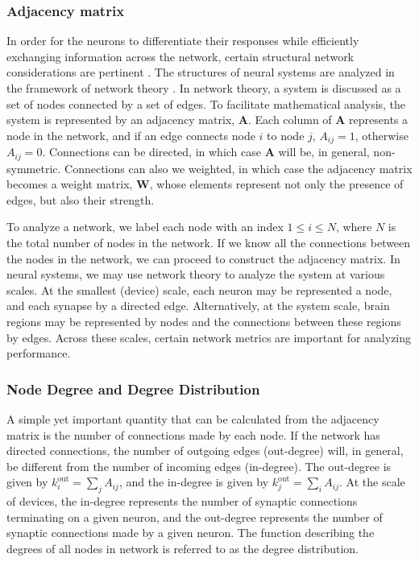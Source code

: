 \documentclass[twocolumn]{article}
\begin{document}
\subsubsection{Adjacency matrix}
In order for the neurons to differentiate their responses while efficiently exchanging information across the network, certain structural network considerations are pertinent \cite{rusp2010}. The structures of neural systems are analyzed in the framework of network theory \cite{eskn2015}. In network theory, a system is discussed as a set of nodes connected by a set of edges. To facilitate mathematical analysis, the system is represented by an adjacency matrix, $\mathbf{A}$. Each column of $\mathbf{A}$ represents a node in the network, and if an edge connects node $i$ to node $j$, $A_{ij} = 1$, otherwise $A_{ij} = 0$. Connections can be directed, in which case $\mathbf{A}$ will be, in general, non-symmetric. Connections can also we weighted, in which case the adjacency matrix becomes a weight matrix, $\mathbf{W}$, whose elements represent not only the presence of edges, but also their strength.

To analyze a network, we label each node with an index $1\le i\le N$, where $N$ is the total number of nodes in the network. If we know all the connections between the nodes in the network, we can proceed to construct the adjacency matrix. In neural systems, we may use network theory to analyze the system at various scales. At the smallest (device) scale, each neuron may be represented a node, and each synapse by a directed edge. Alternatively, at the system scale, brain regions may be represented by nodes and the connections between these regions by edges. Across these scales, certain network metrics are important for analyzing performance. 

\subsubsection{Node Degree and Degree Distribution}
A simple yet important quantity that can be calculated from the adjacency matrix is the number of connections made by each node. If the network has directed connections, the number of outgoing edges (out-degree) will, in general, be different from the number of incoming edges (in-degree). The out-degree is given by $k^{\mathrm{out}}_i = \sum_jA_{ij}$, and the in-degree is given by $k^{\mathrm{out}}_j = \sum_iA_{ij}$. At the scale of devices, the in-degree represents the number of synaptic connections terminating on a given neuron, and the out-degree represents the number of synaptic connections made by a given neuron. The function describing the degrees of all nodes in network is referred to as the degree distribution.
\end{document}
